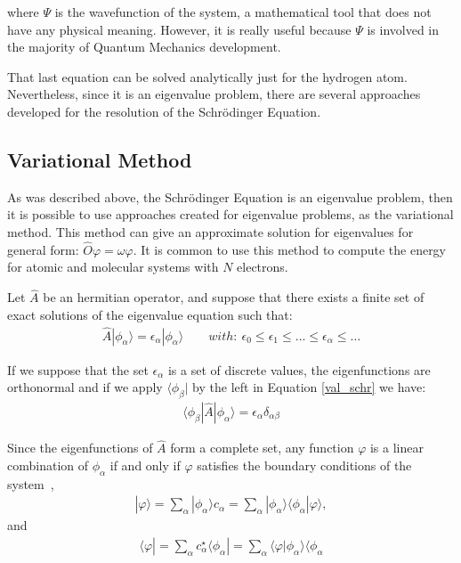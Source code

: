 \noindent where $\Psi$ is the wavefunction of the system, a mathematical tool
that does not have any physical meaning. However, it is really useful because
$\Psi$ is involved in the majority of Quantum Mechanics development.

That last equation can be solved analytically just for the hydrogen atom.
Nevertheless, since it is an eigenvalue problem, there are several approaches
developed for the resolution of the Schrödinger Equation.

\subsection{Variational Method}

As was described above, the Schrödinger Equation is an eigenvalue problem, then
it is possible to use approaches created for eigenvalue problems, as the
variational method. This method can give an approximate solution for
eigenvalues for general form: $\widehat{O}\varphi = \omega\varphi$. It is
common to use this method to compute the energy for atomic and molecular
systems with $N$ electrons.

Let $\widehat{A}$ be an hermitian operator, and suppose that there exists
a finite set of exact solutions of the eigenvalue equation such that:
%
\begin{align} \widehat{A}|\phi_{\alpha} \rangle =
  \epsilon_{\alpha}|\phi_{\alpha} \rangle \qquad with:\ \epsilon_{0} \le
  \epsilon_{1} \le \ldots \le \epsilon_{\alpha} \le \ldots \label{val_schr}
\end{align}

\newpage

If we suppose that the set ${\epsilon_{\alpha}}$ is a set of discrete values,
the eigenfunctions are orthonormal and if we apply $\langle\phi_{\beta}|$ by
the left in Equation \ref{val_schr} we have:
%
\begin{align}
  \langle\phi_{\beta} |\widehat{A} | \phi_{\alpha}\rangle =
  \epsilon_{\alpha}\delta_{\alpha\beta}
\end{align}

Since the eigenfunctions of $\widehat{A}$ form a complete set, any function
$\varphi$ is a linear combination of $\phi_{\alpha}$ if and only if $\varphi$
satisfies the boundary conditions of the system~\cite{szabo},
%
\begin{align}
  |\varphi\rangle = \sum_{\alpha}|\phi_{\alpha}\rangle c_{\alpha} = 
  \sum_{\alpha}|\phi_{\alpha}\rangle\langle\phi_{\alpha} |\varphi\rangle,
\end{align}
\noindent and
\begin{align}
  \langle\varphi| = \sum_{\alpha}c^{\star}_{\alpha} \langle\phi_{\alpha}|= 
  \sum_{\alpha} \langle\varphi | \phi_{\alpha} \rangle \langle\phi_{\alpha}
\end{align}

